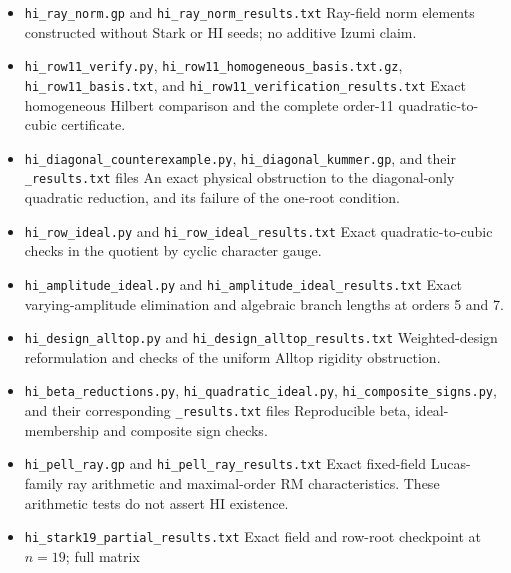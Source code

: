 \documentclass[11pt,reqno]{amsart}
\theoremstyle{plain}
\begin{document}
\begin{itemize}
\item \texttt{hi\_\allowbreak ray\_\allowbreak norm.gp} and \texttt{hi\_\allowbreak ray\_\allowbreak norm\_\allowbreak results.txt}
Ray-field norm elements constructed without Stark or HI seeds; no additive Izumi claim.
\item \texttt{hi\_\allowbreak row11\_\allowbreak verify.py}, \texttt{hi\_\allowbreak row11\_\allowbreak homogeneous\_\allowbreak basis.txt.gz},
\texttt{hi\_\allowbreak row11\_\allowbreak basis.txt}, and \texttt{hi\_\allowbreak row11\_\allowbreak verification\_\allowbreak results.txt}
Exact homogeneous Hilbert comparison and the complete order-11 quadratic-to-cubic certificate.
\item \texttt{hi\_\allowbreak diagonal\_\allowbreak counterexample.py}, \texttt{hi\_\allowbreak diagonal\_\allowbreak kummer.gp}, and their \texttt{\_\allowbreak results.txt} files
An exact physical obstruction to the diagonal-only quadratic reduction, and its failure of the one-root condition.
\item \texttt{hi\_\allowbreak row\_\allowbreak ideal.py} and \texttt{hi\_\allowbreak row\_\allowbreak ideal\_\allowbreak results.txt}
Exact quadratic-to-cubic checks in the quotient by cyclic character gauge.
\item \texttt{hi\_\allowbreak amplitude\_\allowbreak ideal.py} and \texttt{hi\_\allowbreak amplitude\_\allowbreak ideal\_\allowbreak results.txt}
Exact varying-amplitude elimination and algebraic branch lengths at orders 5 and 7.
\item \texttt{hi\_\allowbreak design\_\allowbreak alltop.py} and \texttt{hi\_\allowbreak design\_\allowbreak alltop\_\allowbreak results.txt}
Weighted-design reformulation and checks of the uniform Alltop
rigidity obstruction.
\item \texttt{hi\_\allowbreak beta\_\allowbreak reductions.py}, \texttt{hi\_\allowbreak quadratic\_\allowbreak ideal.py},
\texttt{hi\_\allowbreak composite\_\allowbreak signs.py}, and their corresponding \texttt{\_\allowbreak results.txt} files
Reproducible beta, ideal-membership and composite sign checks.
\item \texttt{hi\_\allowbreak pell\_\allowbreak ray.gp} and \texttt{hi\_\allowbreak pell\_\allowbreak ray\_\allowbreak results.txt}
Exact fixed-field Lucas-family ray arithmetic and maximal-order RM
characteristics. These arithmetic tests do not assert HI existence.
\item \texttt{hi\_\allowbreak stark19\_\allowbreak partial\_\allowbreak results.txt}
Exact field and row-root checkpoint at \(n=19\); full matrix

\end{itemize}
\end{document}

